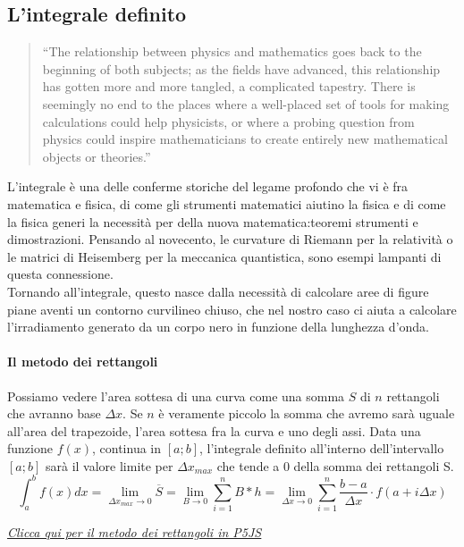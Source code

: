 \documentclass{article}
\begin{document}
\subsection{L'integrale definito}
\begin{quote}
    “The relationship between physics and mathematics goes back to the beginning of both
subjects; as the fields have advanced, this relationship has gotten more and more tangled, a
complicated tapestry. There is seemingly no end to the places where a well-placed set of
tools for making calculations could help physicists, or where a probing question from physics
could inspire mathematicians to create entirely new mathematical objects or theories.”
\end{quote}
L'integrale è una delle conferme storiche del legame profondo che vi è fra matematica e fisica, di come gli strumenti matematici aiutino la fisica e di come la fisica generi la necessità per della nuova matematica:teoremi strumenti e dimostrazioni. Pensando al novecento, le curvature di Riemann per la relatività o le matrici di Heisemberg per la meccanica quantistica, sono esempi lampanti di questa connessione. 
\\
Tornando all'integrale, questo nasce dalla necessità di calcolare aree di figure piane aventi un contorno curvilineo chiuso, che nel nostro caso ci aiuta a calcolare l'irradiamento generato da un corpo nero in funzione della lunghezza d'onda. 
\paragraph{Il metodo dei rettangoli} Possiamo vedere l'area sottesa di una curva come una somma $S$ di $n$ rettangoli che avranno base $\Delta x$. Se $n$ è veramente piccolo la somma che avremo sarà uguale all'area del trapezoide, l'area sottesa fra la curva e uno degli assi.
Data una funzione $f(x)$, continua in $[a;b]$, l'integrale definito all'interno dell'intervallo $[a;b]$ sarà il valore  limite per $\Delta x_{max}$ che tende a $0$ della somma dei rettangoli S.
\[ \int_a^b f(x)dx = \lim_{\Delta x_{max} \to 0 } \overline{S} =  \lim_{B\to 0}\sum_{i=1}^{n} B*h= \lim_{\Delta x\to 0}\sum_{i=1}^{n} \frac{b-a}{\Delta x}\cdot f(a+i \Delta x)\]
 \begin{figure}[h]
\centering
{}
\label{fig: cubed graph}
\end{figure}
\href{https://editor.p5js.org/freihm15@gmail.com/sketches/YjexPYqTc}{{\textit{\underline{Clicca qui per il metodo dei rettangoli in P5JS}}}}
\newpage
\end{document}
